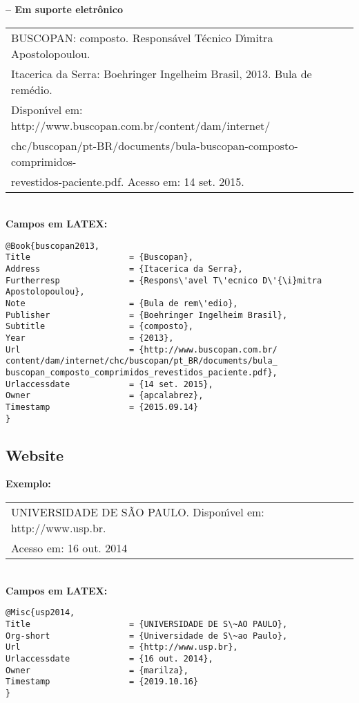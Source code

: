 \textbf{-- Em suporte eletr\^onico} \\

\begin{tabular}{|l|c|} \hline
	BUSCOPAN: composto. Respons\'avel T\'ecnico D\'{\i}mitra Apostolopoulou.\\ Itacerica da Serra: Boehringer Ingelheim Brasil, 2013. Bula de rem\'edio. \\Dispon\'{\i}vel em: http://www.buscopan.com.br/content/dam/internet/\\chc/buscopan/pt-BR/documents/bula-buscopan-composto-comprimidos-\\revestidos-paciente.pdf. Acesso em: 14 set. 2015.
	\\\hline
\end{tabular} \\

\textbf{Campos em LATEX:} 

\begin{verbatim}
@Book{buscopan2013,
Title                    = {Buscopan},
Address                  = {Itacerica da Serra},
Furtherresp              = {Respons\'avel T\'ecnico D\'{\i}mitra 
Apostolopoulou},
Note                     = {Bula de rem\'edio},
Publisher                = {Boehringer Ingelheim Brasil},
Subtitle                 = {composto},
Year                     = {2013},
Url                      = {http://www.buscopan.com.br/
content/dam/internet/chc/buscopan/pt_BR/documents/bula_
buscopan_composto_comprimidos_revestidos_paciente.pdf},
Urlaccessdate            = {14 set. 2015},
Owner                    = {apcalabrez},
Timestamp                = {2015.09.14}
}
\end{verbatim}

\subsection{Website}

\textbf{Exemplo:} \\

\begin{tabular}{|l|c|} \hline
	UNIVERSIDADE DE S\~AO PAULO. Dispon\'{\i}vel em: http://www.usp.br.\\ Acesso em: 16 out. 2014
	\\\hline
\end{tabular} \\

\textbf{Campos em LATEX:} 

\begin{verbatim}
@Misc{usp2014,
Title                    = {UNIVERSIDADE DE S\~AO PAULO},
Org-short                = {Universidade de S\~ao Paulo},
Url                      = {http://www.usp.br},
Urlaccessdate            = {16 out. 2014},
Owner                    = {marilza},
Timestamp                = {2019.10.16}
}
\end{verbatim}

